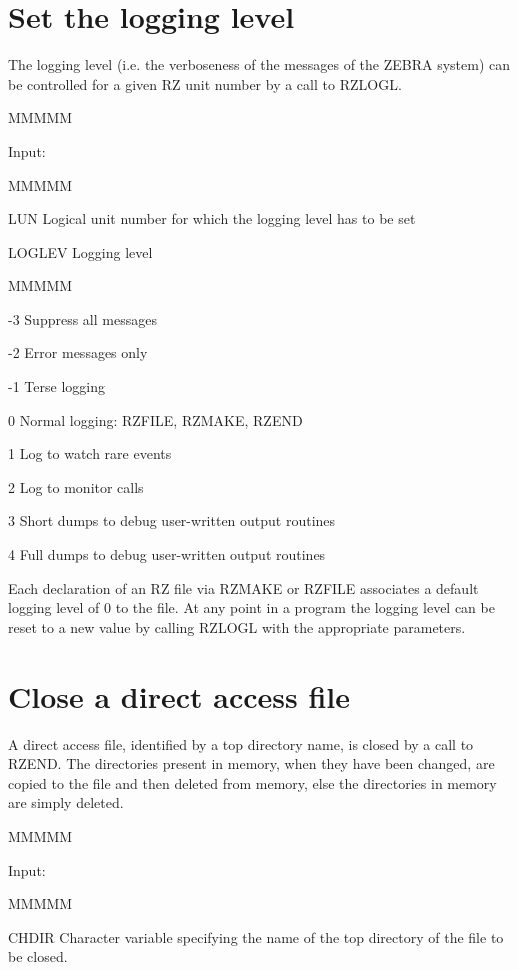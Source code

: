 \section{Set the logging level}
\par The logging level
(i.e. the verboseness of the messages of the ZEBRA system) can be
controlled for a given RZ unit number by a call to RZLOGL.
\begin{DL}{MMMMM}
\item[Input:
]
\begin{DL}{MMMMM}
\item[LUN
]Logical unit number for which the logging level has to be set
\item[LOGLEV
]Logging level
\begin{DL}{MMMMM}
\item[-3
]Suppress all messages
\item[-2
]Error messages only
\item[-1
]Terse logging
\item[ 0
]Normal logging: RZFILE, RZMAKE, RZEND
\item[ 1
]Log to watch rare events
\item[ 2
]Log to monitor calls
\item[ 3
]Short dumps to debug user-written output routines
\item[ 4
]Full dumps to debug user-written output routines
\end{DL}
\end{DL}
\end{DL}
\par Each declaration of an RZ file via RZMAKE or RZFILE
associates a default logging level of 0 to the file.
At any point in a program the logging level can be reset to a new
value by calling RZLOGL with the appropriate parameters.
\section{Close a direct access file}
\par A direct access file, identified by a top directory name,
is closed by a call to RZEND.
The directories present in memory,
when they have been changed,
are copied to the file and then deleted from memory, else
the directories in memory are simply deleted.
\begin{DL}{MMMMM}
\item[Input:
]
\begin{DL}{MMMMM}
\item[CHDIR
]Character variable specifying the name of the top directory of the
file to be closed.
\end{DL}
\end{DL}
